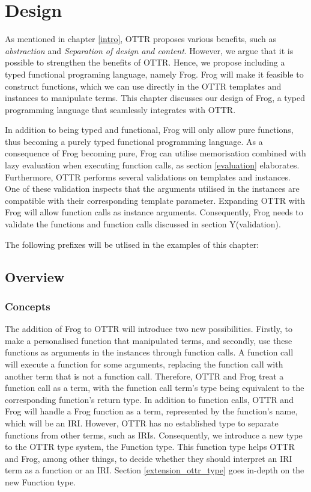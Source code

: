 
\chapter{Design} %
As mentioned in chapter \ref{intro}, OTTR proposes various benefits, such as \emph{abstraction} and \emph{Separation of design and content}. However, we argue that it is possible to strengthen the benefits of OTTR. Hence, we propose including a typed functional programing language, namely Frog. Frog will make it feasible to construct functions, which we can use directly in the OTTR templates and instances to manipulate terms. This chapter discusses our design of Frog, a typed programming language that seamlessly integrates with OTTR.

\para
In addition to being typed and functional, Frog will only allow pure functions, thus becoming a purely typed functional programming language. As a consequence of Frog becoming pure, Frog can utilise memorisation combined with lazy evaluation when executing function calls, as section \ref{evaluation} elaborates. Furthermore, OTTR performs several validations on templates and instances. One of these validation inspects that the arguments utilised in the instances are compatible with their corresponding template parameter. Expanding OTTR with Frog will allow function calls as instance arguments. Consequently, Frog needs to validate the functions and function calls discussed in section Y(validation).

\para
The following prefixes will be utlised in the examples of this chapter:


\section{Overview}

\subsection{Concepts}
\label{concepts}
The addition of Frog to OTTR will introduce two new possibilities. Firstly, to make a personalised function that manipulated terms, and secondly, use these functions as arguments in the instances through function calls. A function call will execute a function for some arguments, replacing the function call with another term that is not a function call. Therefore, OTTR and Frog treat a function call as a term, with the function call term's type being equivalent to the corresponding function's return type. In addition to function calls, OTTR and Frog will handle a Frog function as a term, represented by the function's name, which will be an IRI. However, OTTR has no established type to separate functions from other terms, such as IRIs. Consequently, we introduce a new type to the OTTR type system, the Function type. This function type helps OTTR and Frog, among other things, to decide whether they should interpret an IRI term as a function or an IRI. Section \ref{extension_ottr_type} goes in-depth on the new Function type. 

